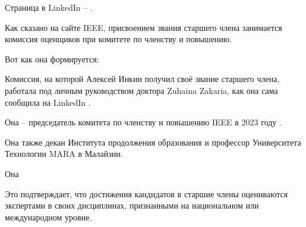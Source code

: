 Страница \MrIeeeReferenceOne в LinkedIn -- .

Как сказано на сайте IEEE,
присвоением звания старшего члена занимается комиссия оценщиков при комитете по членству и повышению.

Вот как она формируется:


Комиссия, на которой Алексей Инкин получил своё звание старшего члена,
работала под личным руководством доктора Zuhaina Zakaria, как она сама сообщила на LinkedIn .

Она -- председатель комитета по членству и повышению IEEE в 2023 году .

Она также декан Института продолжения образования и
профессор Университета Технологии MARA в Малайзии.

Она


Это подтверждает, что достижения кандидатов в старшие члены оцениваются
экспертами в своих дисциплинах, признанными на национальном или международном уровне.
